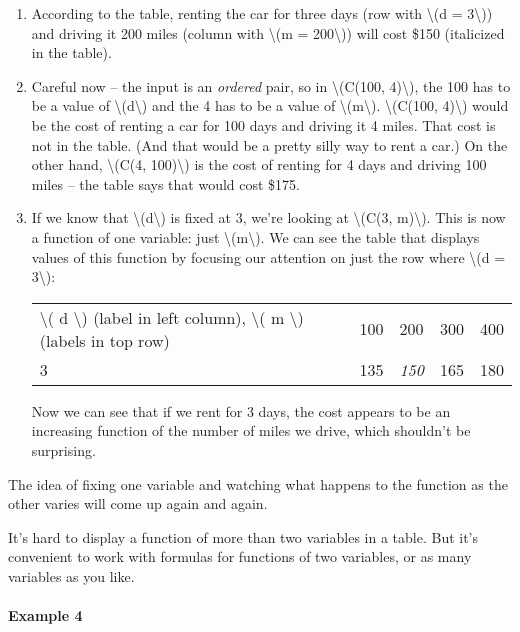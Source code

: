 \begin{enumerate}
\item
  According to the table, renting the car for three days (row with
  \textbackslash{}(d = 3\textbackslash{})) and driving it 200 miles
  (column with \textbackslash{}(m = 200\textbackslash{})) will cost
  \$150 (italicized in the table).
\item
  Careful now -- the input is an \emph{ordered} pair, so in
  \textbackslash{}(C(100, 4)\textbackslash{}), the 100 has to be a value
  of \textbackslash{}(d\textbackslash{}) and the 4 has to be a value of
  \textbackslash{}(m\textbackslash{}). \textbackslash{}(C(100,
  4)\textbackslash{}) would be the cost of renting a car for 100 days
  and driving it 4 miles. That cost is not in the table. (And that would
  be a pretty silly way to rent a car.) On the other hand,
  \textbackslash{}(C(4, 100)\textbackslash{}) is the cost of renting for
  4 days and driving 100 miles -- the table says that would cost \$175.
\item
  If we know that \textbackslash{}(d\textbackslash{}) is fixed at 3,
  we're looking at \textbackslash{}(C(3, m)\textbackslash{}). This is
  now a function of one variable: just
  \textbackslash{}(m\textbackslash{}). We can see the table that
  displays values of this function by focusing our attention on just the
  row where \textbackslash{}(d = 3\textbackslash{}):

  \begin{longtable}[]{@{}lllll@{}}
  \toprule
  \endhead
  \textbackslash{}( d \textbackslash{}) (label in left column),
  \textbackslash{}( m \textbackslash{}) (labels in top row) & 100 & 200
  & 300 & 400\tabularnewline
  3 & 135 & \emph{150} & 165 & 180\tabularnewline
  \bottomrule
  \end{longtable}

  Now we can see that if we rent for 3 days, the cost appears to be an
  increasing function of the number of miles we drive, which shouldn't
  be surprising.
\end{enumerate}

The idea of fixing one variable and watching what happens to the
function as the other varies will come up again and again.

It's hard to display a function of more than two variables in a table.
But it's convenient to work with formulas for functions of two
variables, or as many variables as you like.

\hypertarget{example-4}{%
\paragraph{Example 4}\label{example-4}}


